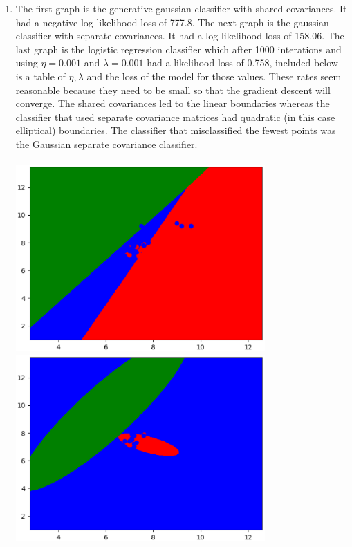 \documentclass[submit]{harvardml}
\begin{document}
\begin{enumerate}
	\item The first graph is the generative gaussian classifier with shared covariances.  It had a negative log likelihood loss of 777.8.  The next graph is the gaussian classifier with separate covariances. It had a log likelihood loss of 158.06.  The last graph is the logistic regression classifier which after 1000 interations and using $\eta = 0.001$ and $\lambda = 0.001$ had a likelihood loss of 0.758, included below is a table of $\eta,\lambda$ and the loss of the model for those values.  These rates seem reasonable because they need to be small so that the gradient descent will converge.  The shared covariances led to the linear boundaries whereas the classifier that used separate covariance matrices had quadratic (in this case elliptical) boundaries.  The classifier that misclassified the fewest points was the Gaussian separate covariance classifier.  \\\\
	\includegraphics[width = 0.75\textwidth]{generative_result_shared_covariances.eps}  \\
	\includegraphics[width = 0.75\textwidth]{generative_result_separate_covariances.eps} \\

\end{enumerate}
\end{document}
